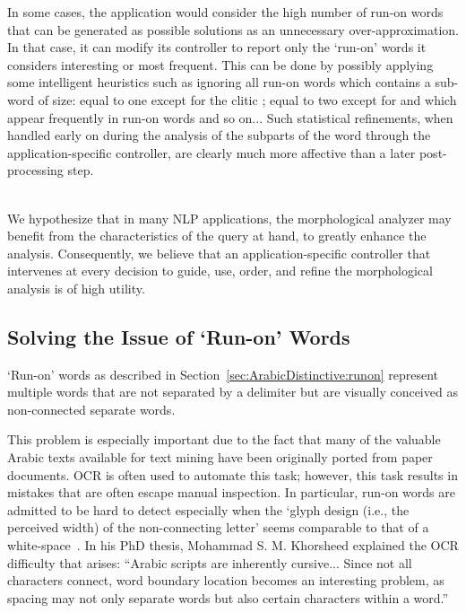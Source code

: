 \documentclass[a4,12pt]{report}
\newcommand{\noVocRL}[1]{\transtrue\novocalize\RL{#1}\vocalize}
\begin{document}
In some cases, the application would consider the high number of run-on words that can be generated as possible solutions
as an unnecessary over-approximation. In that case, it can modify its controller to report only the `run-on' words it considers
interesting or most frequent. This can be done by possibly applying some intelligent heuristics such as ignoring all run-on words
which contains a sub-word of size: equal to one except for the clitic \noVocRL{w}; equal to two except for \noVocRL{mA} 
and \noVocRL{lA} which appear frequently in run-on words and so on... Such statistical refinements, when handled early on during
the analysis of the subparts of the word through the application-specific controller, are clearly much more affective than 
a later post-processing step.

~\\

We hypothesize that in many NLP applications, the morphological analyzer may
benefit from the characteristics of the query at hand, 
to greatly enhance the analysis.
Consequently, we believe that 
an application-specific 
controller that intervenes at every decision to guide, use, order, and 
refine the morphological analysis is of high utility.

\subsection{Solving the Issue of `Run-on' Words}

`Run-on' words as described in Section~\ref{sec:ArabicDistinctive:runon} represent multiple words
that are not separated by a delimiter but are visually conceived as non-connected separate words.

This problem is especially important due to the fact that many of the valuable 
Arabic texts available for text mining have been originally ported from
paper documents. OCR is often used to automate this task; however, this task
results in mistakes that are often escape manual inspection.
In particular, run-on words are admitted 
to be hard to detect especially when the `glyph design (i.e., the
perceived width) of the non-connecting letter' seems comparable
to that of a white-space~\cite{Sou07}. In his PhD thesis, Mohammad S. M. Khorsheed
explained the OCR difficulty that arises: ``Arabic scripts are inherently cursive...
Since not all characters connect, word boundary location becomes an interesting problem, 
as spacing may not only separate words but also certain characters within a word.''~\cite{Khorsheed:00}
\end{document}
